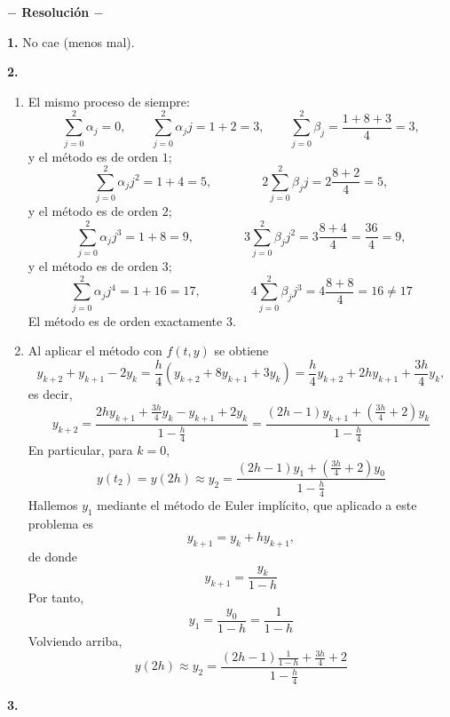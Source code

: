 \documentclass[11pt]{report}
\begin{document}




\begin{center}

	\textbf{$-$ Resolución $-$}

\end{center}


\textbf{1.} No cae (menos mal).

\textbf{2. } 

\begin{enumerate}
    \item El mismo proceso de siempre:
    \[\sum_{j=0}^2 \alpha_j = 0, \qquad \sum_{j=0}^2 \alpha_jj = 1+2 = 3, \qquad \sum_{j=0}^2 \beta_j = \frac{1+8+3}{4} = 3,\]
    y el método es de orden $1$;
    \[\sum_{j=0}^2 \alpha_jj^2 = 1+4 = 5, \qquad \qquad 2\sum_{j=0}^2\beta_jj = 2\frac{8+2}{4} = 5,\]
    y el método es de orden $2$;
    \[\sum_{j=0}^2 \alpha_jj^3 = 1+8 = 9, \qquad \qquad 3\sum_{j=0}^2 \beta_jj^2 = 3\frac{8+4}{4} = \frac{36}{4} = 9,\]
    y el método es de orden $3$;
    \[\sum_{j=0}^2 \alpha_jj^4 = 1+16 = 17, \qquad \qquad 4\sum_{j=0}^2 \beta_jj^3 = 4 \frac{8+8}{4} = 16 \neq 17\]
    El método es de orden exactamente $3$.
    \item Al aplicar el método con $f(t,y)$ se obtiene
    \[y_{k+2}+y_{k+1}-2y_k = \frac{h}{4}(y_{k+2}+8y_{k+1}+3y_k) = \frac{h}{4}y_{k+2}+2hy_{k+1}+\frac{3h}{4}y_k,\]
    es decir,
    \[y_{k+2}= \frac{2hy_{k+1}+\frac{3h}{4}y_k-y_{k+1}+2y_k}{1-\frac{h}{4}} = \frac{(2h-1)y_{k+1}+(\frac{3h}{4}+2)y_k}{1-\frac{h}{4}}\]
    En particular, para $k = 0$,
    \[y(t_2) = y(2h) \approx y_{2}= \frac{(2h-1)y_{1}+(\frac{3h}{4}+2)y_0}{1-\frac{h}{4}}\]
    Hallemos $y_1$ mediante el método de Euler implícito, que aplicado a este problema es
    \[y_{k+1}=y_k+hy_{k+1},\]
    de donde
    \[y_{k+1} = \frac{y_k}{1-h}\]
    Por tanto,
    \[y_1 = \frac{y_0}{1-h} = \frac{1}{1-h}\]
    Volviendo arriba,
    \[y(2h) \approx y_{2}= \frac{(2h-1)\frac{1}{1-h}+\frac{3h}{4}+2}{1-\frac{h}{4}}\]
\end{enumerate}

\pagebreak

\textbf{3. }
\end{document}

